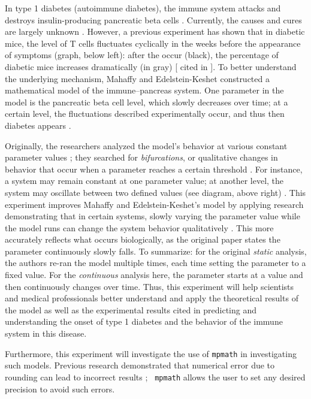 
In type 1 diabetes (autoimmune diabetes), the immune system attacks and
destroys insulin-producing pancreatic beta cells \cite{PubMed2013}.
Currently, the causes and cures are largely unknown \cite{Daneman2006}.
However, a previous experiment has shown that in diabetic mice, the level of
T cells fluctuates cyclically in the weeks before the appearance of symptoms
(graph, below left): after the  occur (black), the
percentage of diabetic mice increases dramatically (in gray)
[\cite{Trudeau2003} cited in \cite{Mahaffy2007}]. To better understand the
underlying mechanism, Mahaffy and Edelstein-Keshet constructed a
mathematical model of the immune–pancreas system. One parameter in the model
is the pancreatic beta cell level, which slowly decreases over time; at a
certain level, the fluctuations described experimentally occur, and thus
then diabetes appears \cite{Mahaffy2007}.

\setupcaptions[location=bottom,width=10in]


Originally, the researchers analyzed the model’s behavior at various
constant parameter values \cite{Mahaffy2007}; they searched for {\em
  bifurcations}, or qualitative changes in behavior that occur when a
parameter reaches a certain threshold \cite{VanVoorn2006}. For instance, a
system may remain constant at one parameter value; at another level, the
system may oscillate between two defined values (see diagram, above right)
\cite{VanVoorn2006}. This experiment improves Mahaffy and Edelstein-Keshet’s
model by applying research demonstrating that in certain systems, slowly
varying the parameter value while the model runs can change the system
behavior qualitatively \cite{Baer1989}. This more accurately reflects what
occurs biologically, as the original paper states the parameter continuously
slowly falls. To summarize: for the original {\em static} analysis, the
authors re-ran the model multiple times, each time setting the parameter to
a fixed value. For the {\em continuous} analysis here, the parameter starts
at a value and then continuously changes over time. Thus, this experiment
will help scientists and medical professionals better understand and apply
the theoretical results of the model as well as the experimental results
cited in predicting and understanding the onset of type 1 diabetes and the
behavior of the immune system in this disease.

Furthermore, this experiment will investigate the use of {\tt mpmath} in
investigating such models. Previous research demonstrated that numerical
error due to rounding can lead to incorrect results \cite{Baer1989}; {\tt
  mpmath} allows the user to set any desired precision to avoid such errors.
